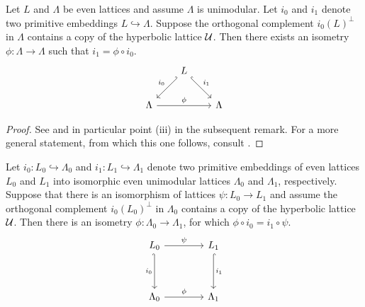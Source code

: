 \begin{proposition}
    \label{extending an isometry 1}
    \emph{\cite{Nikulin1980}}
    Let $L$ and $\Lambda$ be even lattices and assume $\Lambda$ is unimodular. Let $i_0$ and $i_1$ denote two primitive embeddings $L \hookrightarrow \Lambda$. Suppose the orthogonal complement $i_0(L)^\perp$ in $\Lambda$ contains a copy of the hyperbolic lattice $\mathcal U$. Then there exists an isometry $\phi \colon \Lambda \to \Lambda$ such that $i_1 = \phi \circ i_0$.
    \[\begin{tikzcd}[row sep = 1em, column sep = 2em]
        & L \\
        \\
        \Lambda && \Lambda
        \arrow["{i_0}"', hook', from=1-2, to=3-1]
        \arrow["{i_1}", hook, from=1-2, to=3-3]
        \arrow["\phi", from=3-1, to=3-3]
    \end{tikzcd}\]
\end{proposition}

\begin{proof}
    See \cite[\S 14, Theorem 1.12]{Huybrechts2016} and in particular point (iii) in the subsequent remark. For a more general statement, from which this one follows, consult \cite[Theorem 1.14.4]{Nikulin1980}.
\end{proof}

\begin{corollary}
    \label{extending an isometry 2}
    Let $i_0 \colon L_0 \hookrightarrow \Lambda_0$ and $i_1 \colon L_1 \hookrightarrow \Lambda_1$ denote two primitive embeddings of even lattices $L_0$ and $L_1$ into isomorphic even unimodular lattices $\Lambda_0$ and $\Lambda_1$, respectively. Suppose that there is an isomorphism of lattices $\psi \colon L_0 \to L_1$ and assume the orthogonal complement $i_0(L_0)^\perp$ in $\Lambda_0$ contains a copy of the hyperbolic lattice $\mathcal U$. Then there is an isometry $\phi \colon \Lambda_0 \to \Lambda_1$, for which $\phi \circ i_0 = i_1 \circ \psi$.
    \[\begin{tikzcd}[column sep = 2em]
        {L_0} && {L_1} \\
        \\
        \Lambda_0 && \Lambda_1
        \arrow["\psi", from=1-1, to=1-3]
        \arrow["{i_0}"', hook', from=1-1, to=3-1]
        \arrow["{i_1}", hook, from=1-3, to=3-3]
        \arrow["\phi", from=3-1, to=3-3]
    \end{tikzcd}\]
\end{corollary}

